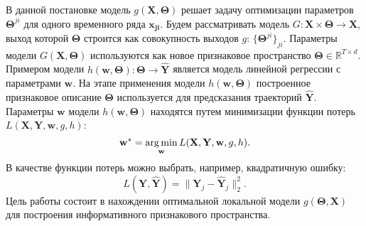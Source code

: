 \documentclass[12pt,twoside]{article}
\begin{document}
В данной постановке модель $g(\mathbf{X}, \mathbf{\Theta})$ решает задачу оптимизации параметров $\mathbf{\Theta}^{ji}$ для одного временного ряда $\mathbf{x_{ji}}$. Будем рассматривать модель $G: \mathbf{X}\times\mathbf{\Theta}\to\mathbf{X}$, выход которой $\mathbf{\Theta}$ строится как совокупность выходов $g$: $\{\mathbf{\Theta}^{ji}\}_{ji}$. Параметры модели $G(\mathbf{X}, \mathbf{\Theta})$ используются как новое признаковое пространство $\mathbf{\Theta}\in\mathbb{R}^{T\times d}$.
Примером модели $h(\mathbf{w}, \mathbf{\Theta}): \mathbf{\Theta}\to\mathbf{\hat{Y}}$ является модель линейной регрессии с параметрами $\mathbf{w}$. На этапе применения модели $h(\mathbf{w}, \mathbf{\Theta})$ построенное признаковое описание $\mathbf{\Theta}$ используется для предсказания траекторий $\mathbf{\hat{Y}}$.
Параметры $\mathbf{w}$ модели $h(\mathbf{w}, \mathbf{\Theta})$ находятся путем минимизации функции потерь $L(\mathbf{X}, \mathbf{Y}, \mathbf{w}, g, h)$:
\begin{equation}
\mathbf{w^*} = \argmin_{\mathbf{w}} L(\mathbf{X}, \mathbf{Y}, \mathbf{w}, g, h).
\end{equation}
В качестве функции потерь можно выбрать, например, квадратичную ошибку:
\begin{equation}
L(\mathbf{Y}, \mathbf{\hat{Y}}) = \|\mathbf{Y}_j-\mathbf{\hat{Y}}_j\|^2_2.
\end{equation}
Цель работы состоит в нахождении оптимальной локальной модели $g(\mathbf{\Theta}, \mathbf{X})$ для построения информативного признакового пространства.
\end{document}
